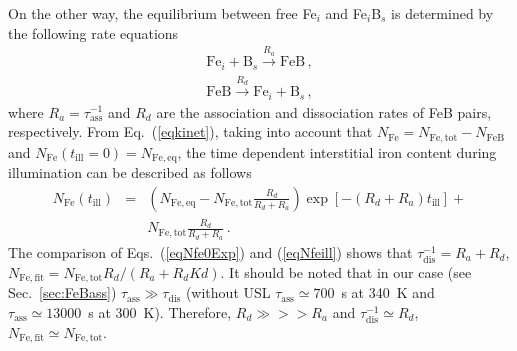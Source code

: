 \documentclass[%
 aip,jap,
 amsmath,amssymb,
 reprint,%
]{revtex4-1}
\begin{document}

On the other way,
the equilibrium between free Fe$_i$ and Fe$_i$B$_s$ is determined by the following rate equations
\begin{eqnarray}
\label{eqkinet}
\mathrm{Fe}_i+\mathrm{B}_s\xrightarrow{R_a}\mathrm{FeB}\,,\nonumber\\
\mathrm{FeB}\xrightarrow{R_d}\mathrm{Fe}_i+\mathrm{B}_s\,,
\end{eqnarray}
where
$R_a=\tau_\mathrm{ass}^{-1}$ and
$R_d$ are the association and dissociation rates of FeB pairs, respectively.
From Eq.~(\ref{eqkinet}), taking into account that
$N_\mathrm{Fe}=N_\mathrm{Fe,tot}-N_\mathrm{FeB}$
and
$N_\mathrm{Fe}(t_\mathrm{ill}=0)=N_\mathrm{Fe,eq}$,
the time dependent interstitial iron content during illumination can be described as follows
\begin{eqnarray}
\label{eqNfeill}
N_\mathrm{Fe}(t_\mathrm{ill})&=&\left(N_\mathrm{Fe,eq}-N_\mathrm{Fe,tot}
\frac{R_d}{R_d+R_a}\right)\exp[-(R_d+R_a)t_\mathrm{ill}]+\nonumber\\
&&N_\mathrm{Fe,tot}\frac{R_d}{R_d+R_a}\,.
\end{eqnarray}
The comparison of Eqs.~(\ref{eqNfe0Exp}) and (\ref{eqNfeill}) shows that
$\tau_\mathrm{dis}^{-1}=R_a+R_d$,
$N_\mathrm{Fe,fit}=N_\mathrm{Fe,tot}R_d/(R_a+R_dKd)$.
It should be noted that in our case
(see Sec.~\ref{sec:FeBass}) $\tau_\mathrm{ass}\gg \tau_\mathrm{dis}$
(without USL $\tau_\mathrm{ass}\simeq700$~s at 340~K and $\tau_\mathrm{ass}\simeq13000$~s at 300~K). Therefore, $R_d\gg>>R_a$ and $\tau_\mathrm{dis}^{-1}\simeq R_d$,
$N_\mathrm{Fe,fit}\simeq N_\mathrm{Fe,tot}$.
\end{document}
